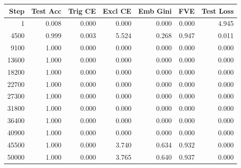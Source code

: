 \begin{longtable}{rrrrrrr}
\toprule
Step & Test Acc & Trig CE & Excl CE & Emb Gini & FVE & Test Loss \\
\midrule
\endhead
1 & 0.008 & 0.000 & 0.000 & 0.000 & 0.000 & 4.945 \\
4500 & 0.999 & 0.003 & 5.524 & 0.268 & 0.947 & 0.011 \\
9100 & 1.000 & 0.000 & 0.000 & 0.000 & 0.000 & 0.000 \\
13600 & 1.000 & 0.000 & 0.000 & 0.000 & 0.000 & 0.000 \\
18200 & 1.000 & 0.000 & 0.000 & 0.000 & 0.000 & 0.000 \\
22700 & 1.000 & 0.000 & 0.000 & 0.000 & 0.000 & 0.000 \\
27300 & 1.000 & 0.000 & 0.000 & 0.000 & 0.000 & 0.000 \\
31800 & 1.000 & 0.000 & 0.000 & 0.000 & 0.000 & 0.000 \\
36400 & 1.000 & 0.000 & 0.000 & 0.000 & 0.000 & 0.000 \\
40900 & 1.000 & 0.000 & 0.000 & 0.000 & 0.000 & 0.000 \\
45500 & 1.000 & 0.000 & 3.740 & 0.634 & 0.932 & 0.000 \\
50000 & 1.000 & 0.000 & 3.765 & 0.640 & 0.937 & 0.000 \\
\bottomrule
\end{longtable}
